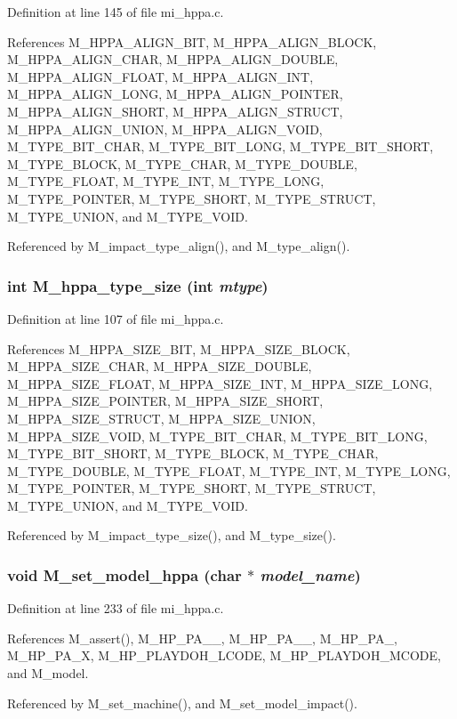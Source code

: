 Definition at line 145 of file mi\_\-hppa.c.

References M\_\-HPPA\_\-ALIGN\_\-BIT, M\_\-HPPA\_\-ALIGN\_\-BLOCK, M\_\-HPPA\_\-ALIGN\_\-CHAR, M\_\-HPPA\_\-ALIGN\_\-DOUBLE, M\_\-HPPA\_\-ALIGN\_\-FLOAT, M\_\-HPPA\_\-ALIGN\_\-INT, M\_\-HPPA\_\-ALIGN\_\-LONG, M\_\-HPPA\_\-ALIGN\_\-POINTER, M\_\-HPPA\_\-ALIGN\_\-SHORT, M\_\-HPPA\_\-ALIGN\_\-STRUCT, M\_\-HPPA\_\-ALIGN\_\-UNION, M\_\-HPPA\_\-ALIGN\_\-VOID, M\_\-TYPE\_\-BIT\_\-CHAR, M\_\-TYPE\_\-BIT\_\-LONG, M\_\-TYPE\_\-BIT\_\-SHORT, M\_\-TYPE\_\-BLOCK, M\_\-TYPE\_\-CHAR, M\_\-TYPE\_\-DOUBLE, M\_\-TYPE\_\-FLOAT, M\_\-TYPE\_\-INT, M\_\-TYPE\_\-LONG, M\_\-TYPE\_\-POINTER, M\_\-TYPE\_\-SHORT, M\_\-TYPE\_\-STRUCT, M\_\-TYPE\_\-UNION, and M\_\-TYPE\_\-VOID.

Referenced by M\_\-impact\_\-type\_\-align(), and M\_\-type\_\-align().
\subsubsection{\setlength{\rightskip}{0pt plus 5cm}int M\_\-hppa\_\-type\_\-size (int {\em mtype})}\label{mi__hppa_8c_31993e4bb89ce0231d90ceb9d92160ba}




Definition at line 107 of file mi\_\-hppa.c.

References M\_\-HPPA\_\-SIZE\_\-BIT, M\_\-HPPA\_\-SIZE\_\-BLOCK, M\_\-HPPA\_\-SIZE\_\-CHAR, M\_\-HPPA\_\-SIZE\_\-DOUBLE, M\_\-HPPA\_\-SIZE\_\-FLOAT, M\_\-HPPA\_\-SIZE\_\-INT, M\_\-HPPA\_\-SIZE\_\-LONG, M\_\-HPPA\_\-SIZE\_\-POINTER, M\_\-HPPA\_\-SIZE\_\-SHORT, M\_\-HPPA\_\-SIZE\_\-STRUCT, M\_\-HPPA\_\-SIZE\_\-UNION, M\_\-HPPA\_\-SIZE\_\-VOID, M\_\-TYPE\_\-BIT\_\-CHAR, M\_\-TYPE\_\-BIT\_\-LONG, M\_\-TYPE\_\-BIT\_\-SHORT, M\_\-TYPE\_\-BLOCK, M\_\-TYPE\_\-CHAR, M\_\-TYPE\_\-DOUBLE, M\_\-TYPE\_\-FLOAT, M\_\-TYPE\_\-INT, M\_\-TYPE\_\-LONG, M\_\-TYPE\_\-POINTER, M\_\-TYPE\_\-SHORT, M\_\-TYPE\_\-STRUCT, M\_\-TYPE\_\-UNION, and M\_\-TYPE\_\-VOID.

Referenced by M\_\-impact\_\-type\_\-size(), and M\_\-type\_\-size().
\subsubsection{\setlength{\rightskip}{0pt plus 5cm}void M\_\-set\_\-model\_\-hppa (char $\ast$ {\em model\_\-name})}\label{mi__hppa_8c_21c39049e128e6bfeced8eb8de6e2565}




Definition at line 233 of file mi\_\-hppa.c.

References M\_\-assert(), M\_\-HP\_\-PA\_\_, M\_\-HP\_\-PA\_\_, M\_\-HP\_\-PA\_, M\_\-HP\_\-PA\_\-X, M\_\-HP\_\-PLAYDOH\_\-LCODE, M\_\-HP\_\-PLAYDOH\_\-MCODE, and M\_\-model.

Referenced by M\_\-set\_\-machine(), and M\_\-set\_\-model\_\-impact().